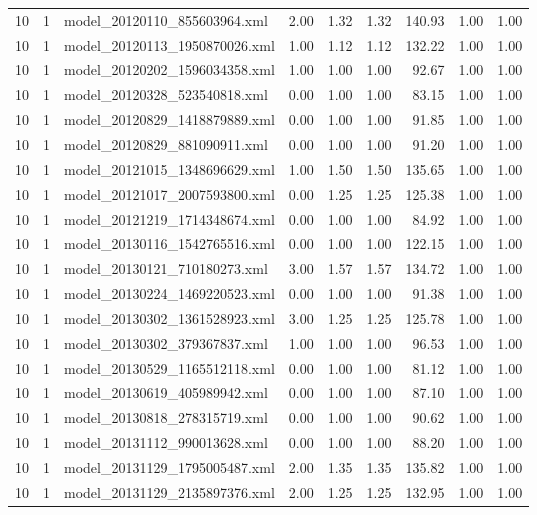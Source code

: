 \begin{table}[ht]
\begin{tabular}{rrlrrrrrr}
   10 &   1 & model\_20120110\_855603964.xml & 2.00 & 1.32 & 1.32 & 140.93 & 1.00 & 1.00 \\ 
   10 &   1 & model\_20120113\_1950870026.xml & 1.00 & 1.12 & 1.12 & 132.22 & 1.00 & 1.00 \\ 
   10 &   1 & model\_20120202\_1596034358.xml & 1.00 & 1.00 & 1.00 & 92.67 & 1.00 & 1.00 \\ 
   10 &   1 & model\_20120328\_523540818.xml & 0.00 & 1.00 & 1.00 & 83.15 & 1.00 & 1.00 \\ 
   10 &   1 & model\_20120829\_1418879889.xml & 0.00 & 1.00 & 1.00 & 91.85 & 1.00 & 1.00 \\ 
   10 &   1 & model\_20120829\_881090911.xml & 0.00 & 1.00 & 1.00 & 91.20 & 1.00 & 1.00 \\ 
   10 &   1 & model\_20121015\_1348696629.xml & 1.00 & 1.50 & 1.50 & 135.65 & 1.00 & 1.00 \\ 
   10 &   1 & model\_20121017\_2007593800.xml & 0.00 & 1.25 & 1.25 & 125.38 & 1.00 & 1.00 \\ 
   10 &   1 & model\_20121219\_1714348674.xml & 0.00 & 1.00 & 1.00 & 84.92 & 1.00 & 1.00 \\ 
   10 &   1 & model\_20130116\_1542765516.xml & 0.00 & 1.00 & 1.00 & 122.15 & 1.00 & 1.00 \\ 
   10 &   1 & model\_20130121\_710180273.xml & 3.00 & 1.57 & 1.57 & 134.72 & 1.00 & 1.00 \\ 
   10 &   1 & model\_20130224\_1469220523.xml & 0.00 & 1.00 & 1.00 & 91.38 & 1.00 & 1.00 \\ 
   10 &   1 & model\_20130302\_1361528923.xml & 3.00 & 1.25 & 1.25 & 125.78 & 1.00 & 1.00 \\ 
   10 &   1 & model\_20130302\_379367837.xml & 1.00 & 1.00 & 1.00 & 96.53 & 1.00 & 1.00 \\ 
   10 &   1 & model\_20130529\_1165512118.xml & 0.00 & 1.00 & 1.00 & 81.12 & 1.00 & 1.00 \\ 
   10 &   1 & model\_20130619\_405989942.xml & 0.00 & 1.00 & 1.00 & 87.10 & 1.00 & 1.00 \\ 
   10 &   1 & model\_20130818\_278315719.xml & 0.00 & 1.00 & 1.00 & 90.62 & 1.00 & 1.00 \\ 
   10 &   1 & model\_20131112\_990013628.xml & 0.00 & 1.00 & 1.00 & 88.20 & 1.00 & 1.00 \\ 
   10 &   1 & model\_20131129\_1795005487.xml & 2.00 & 1.35 & 1.35 & 135.82 & 1.00 & 1.00 \\ 
   10 &   1 & model\_20131129\_2135897376.xml & 2.00 & 1.25 & 1.25 & 132.95 & 1.00 & 1.00 \\ 

\end{tabular}
\end{table}
